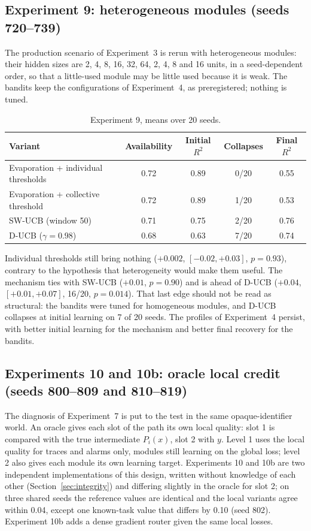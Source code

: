 \documentclass[11pt,a4paper]{article}
\begin{document}
\subsection{Experiment 9: heterogeneous modules (seeds 720--739)}

The production scenario of Experiment~3 is rerun with heterogeneous modules: their hidden sizes are 2, 4, 8, 16, 32, 64, 2, 4, 8 and 16 units, in a seed-dependent order, so that a little-used module may be little used because it is weak. The bandits keep the configurations of Experiment~4, as preregistered; nothing is tuned.

\begin{table}[h]
\centering\small\setlength{\tabcolsep}{5pt}
\begin{tabular}{lcccc}
\toprule
Variant & Availability & Initial $R^2$ & Collapses & Final $R^2$ \\
\midrule
Evaporation + individual thresholds & 0.72 & 0.89 & 0/20 & 0.55 \\
Evaporation + collective threshold & 0.72 & 0.89 & 1/20 & 0.53 \\
SW-UCB (window 50) & 0.71 & 0.75 & 2/20 & 0.76 \\
D-UCB ($\gamma = 0.98$) & 0.68 & 0.63 & 7/20 & 0.74 \\
\bottomrule
\end{tabular}
\caption{Experiment 9, means over 20 seeds.}
\label{tab:exp9}
\end{table}

Individual thresholds still bring nothing ($+0.002$, $[-0.02, +0.03]$, $p = 0.93$), contrary to the hypothesis that heterogeneity would make them useful. The mechanism ties with SW-UCB ($+0.01$, $p = 0.90$) and is ahead of D-UCB ($+0.04$, $[+0.01, +0.07]$, 16/20, $p = 0.014$). That last edge should not be read as structural: the bandits were tuned for homogeneous modules, and D-UCB collapses at initial learning on 7 of 20 seeds. The profiles of Experiment~4 persist, with better initial learning for the mechanism and better final recovery for the bandits.

\subsection{Experiments 10 and 10b: oracle local credit (seeds 800--809 and 810--819)}

The diagnosis of Experiment~7 is put to the test in the same opaque-identifier world. An oracle gives each slot of the path its own local quality: slot 1 is compared with the true intermediate $P_i(x)$, slot 2 with $y$. Level 1 uses the local quality for traces and alarms only, modules still learning on the global loss; level 2 also gives each module its own learning target. Experiments 10 and 10b are two independent implementations of this design, written without knowledge of each other (Section~\ref{sec:integrity}) and differing slightly in the oracle for slot 2; on three shared seeds the reference values are identical and the local variants agree within 0.04, except one known-task value that differs by 0.10 (seed 802). Experiment 10b adds a dense gradient router given the same local losses.
\end{document}
